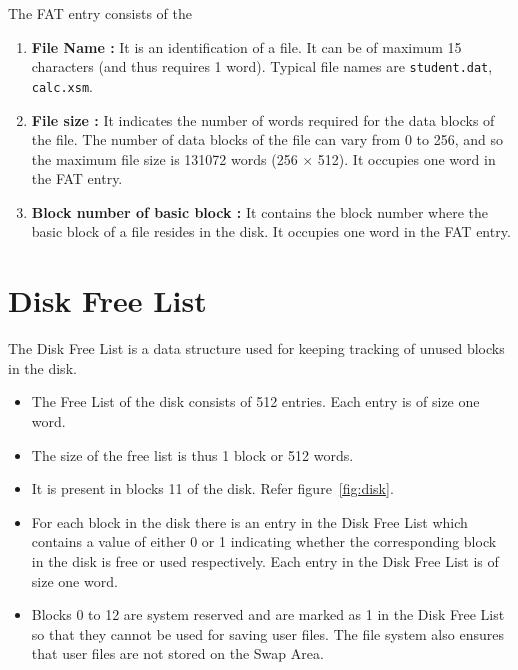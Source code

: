 \documentclass[11pt]{article}
\begin{document}
The FAT entry consists of the
\begin{enumerate}
	\item \textbf{File Name :} It is an identification of a file. It can be of maximum 15 characters (and thus requires 1 word). Typical file names are \texttt{student.dat}, \texttt{calc.xsm}.
	\item \textbf{File size :} It indicates the number of words required for the data blocks of the file. The number of data blocks of the file can vary from 0 to 256, and so the maximum file size is 131072 words (256 $\times$ 512). It occupies one word in the FAT entry.
	\item \textbf{Block number of basic block :} It contains the block number where the basic block of a file resides in the disk. It occupies one word in the FAT entry.
\end{enumerate}



\section{Disk Free List}
\label{lbl:disklst}
The Disk Free List is a data structure used for keeping tracking of unused blocks in the disk. 


\begin{itemize}
	\item  The Free List of the disk consists of 512 entries. Each entry is of size one word.
	\item  The size of the free list is thus 1 block or 512 words.
	\item  It is present in blocks 11 of the disk. Refer figure~\ref{fig:disk}. 
	\item  For each block in the disk there is an entry in the Disk Free List which contains a value of either 0 or 1 indicating whether the corresponding block in the disk is free or used respectively. Each entry in the Disk Free List is of size one word.  
	\item Blocks 0 to 12 are system reserved and are marked as 1 in the Disk Free List so that they cannot be used for saving user files. The file system also ensures that user files are not stored on the Swap Area.
\end{itemize}
\end{document}
